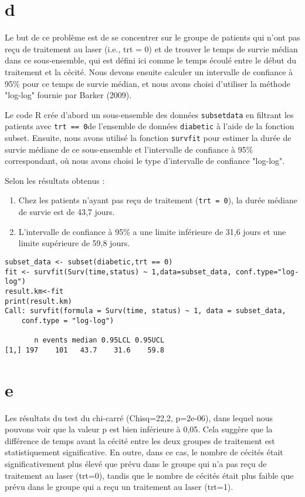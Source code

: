 \documentclass[../main.tex]{subfiles}
\begin{document}
\begin{CJK*}{UTF8}{gbsn}
\section{d}

Le but de ce problème est de se concentrer sur le groupe de patients qui n'ont pas reçu de traitement au laser (i.e., trt = 0) et de trouver le temps de survie médian dans ce sous-ensemble, qui est défini ici comme le temps écoulé entre le début du traitement et la cécité. Nous devons ensuite calculer un intervalle de confiance à 95\% pour ce temps de survie médian, et nous avons choisi d'utiliser la méthode "log-log" fournie par Barker (2009).

Le code R crée d'abord un sous-ensemble des données \texttt{subsetdata} en filtrant les patients avec \texttt{trt == 0}de l'ensemble de données \texttt{diabetic} à l'aide de la fonction subset. Ensuite, nous avons utilisé la fonction \texttt{survfit} pour estimer la durée de survie médiane de ce sous-ensemble et l'intervalle de confiance à 95\% correspondant, où nous avons choisi le type d'intervalle de confiance "log-log".

Selon les résultats obtenus :
\begin{enumerate}
  \item Chez les patients n'ayant pas reçu de traitement (\texttt{trt = 0}), la durée médiane de survie est de 43,7 jours.
  \item L'intervalle de confiance à 95\% a une limite inférieure de 31,6 jours et une limite supérieure de 59,8 jours.
\end{enumerate}

\begin{lstlisting}
subset_data <- subset(diabetic,trt == 0)
fit <- survfit(Surv(time,status) ~ 1,data=subset_data, conf.type="log-log")
result.km<-fit
print(result.km)
Call: survfit(formula = Surv(time, status) ~ 1, data = subset_data, 
    conf.type = "log-log")

       n events median 0.95LCL 0.95UCL
[1,] 197    101   43.7    31.6    59.8
\end{lstlisting}

\section{e}
Les résultats du test du chi-carré (Chisq=22,2, p=2e-06), dans lequel nous pouvons voir que la valeur p est bien inférieure à 0,05. Cela suggère que la différence de temps avant la cécité entre les deux groupes de traitement est statistiquement significative. En outre, dans ce cas, le nombre de cécités était significativement plus élevé que prévu dans le groupe qui n'a pas reçu de traitement au laser (trt=0), tandis que le nombre de cécités était plus faible que prévu dans le groupe qui a reçu un traitement au laser (trt=1).


\end{CJK*}
\end{document}

